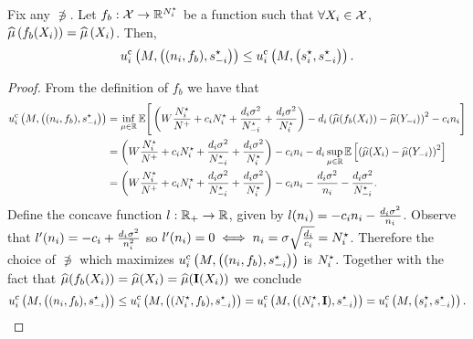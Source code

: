\begin{lemma}
   \label{lem:NIC-part3} 
   Fix any $\nni$. Let $f_b:\mathcal{X}\rightarrow\mathbb{R}^{N^\star_i}$ be a function such that
    $\forall X_{i}\in\mathcal{X}$, $\widehat{\mu}\left(f_b(X_{i})\right)=\widehat{\mu}\left(X_{i}\right)$.
    Then,
    \begin{align*}
        u^{\rm c}_{i} \left(M, \left((n_i,f_b),s_{-i}^{\star} \right)\right)
        \leq
        u^{\rm c}_{i} \left(M, \left(s_{i}^{\star},s_{-i}^{\star} \right)\right) .
    \end{align*}
\end{lemma}
\begin{proof}
    From the definition of $f_b$ we have that 
    \begin{align*}
        u^{\rm c}_{i} \left(M, \left((n_i,f_b),s_{-i}^{\star} \right)\right)
        &=
        \inf_{\mu\in\mathbb{R}}
        \mathbb{E}\Bigg[
            \left(
                W \frac{N^\star_i}{N^{+}} + c_i N^\star_i  +  \frac{d_i\sigma^2}{N^\star_{-i}} +  \frac{d_i\sigma^2}{ N^\star_i} 
            \right)
            -  d_i\left(
                \widehat{\mu}(f_b(X_{i}))-\widehat{\mu}(Y_{-i})
            \right)^2
            -c_in_i
        \Bigg]
        \\
        &=
        \left(
            W \frac{N^\star_i}{N^{+}} + c_i N^\star_i  +  \frac{d_i\sigma^2}{N^\star_{-i}} +  \frac{d_i\sigma^2}{ N^\star_i} 
        \right)
        -c_in_i
        -d_i
        \sup_{\mu\in\mathbb{R}}
        \mathbb{E}\left[
            \left(
                \widehat{\mu}(X_{i})-\widehat{\mu}(Y_{-i})
            \right)^2
        \right]
        \\
        &=
        \left(
            W \frac{N^\star_i}{N^{+}} + c_i N^\star_i  +  \frac{d_i\sigma^2}{N^\star_{-i}} +  \frac{d_i\sigma^2}{ N^\star_i} 
        \right)
        -c_in_i
        -\frac{d_i\sigma^2}{n_i}
        -\frac{d_i\sigma^2}{N^\star_{-i}}
        .
    \end{align*}
    Define the concave function $l:\mathbb{R}_+\rightarrow\mathbb{R}$, given by $l(n_i)=-c_in_i-\frac{d_i\sigma^2}{n_i}$. Observe that $l'(n_i)=-c_i+\frac{d_i\sigma^2}{n_i^2}$ so $l'(n_i)=0\iff n_i=\sigma\sqrt{\frac{d_i}{c_i}}=N^\star_i$. Therefore the choice of $\nni$ which maximizes $u^{\rm c}_{i} \left(M, \left((n_i,f_b),s_{-i}^{\star} \right)\right)$ is $N^\star_i$. Together with the fact that $\widehat{\mu}(f_b(X_{i}))=\widehat{\mu}(X_{i})=\widehat{\mu}({\rm \bf I}(X_{i}))$ we conclude
    \begin{align*}
        u^{\rm c}_{i} \left(M, \left((n_i,f_b),s_{-i}^{\star} \right)\right)
        \leq
        u^{\rm c}_{i} \left(M, \left((N^\star_i,f_b),s_{-i}^{\star} \right)\right)
        =
        u^{\rm c}_{i} \left(M, \left((N^\star_i,{\rm \bf I}),s_{-i}^{\star} \right)\right)
        =
        u^{\rm c}_{i} \left(M, \left(s_{i}^{\star},s_{-i}^{\star} \right)\right) .
    \end{align*}
\end{proof}


